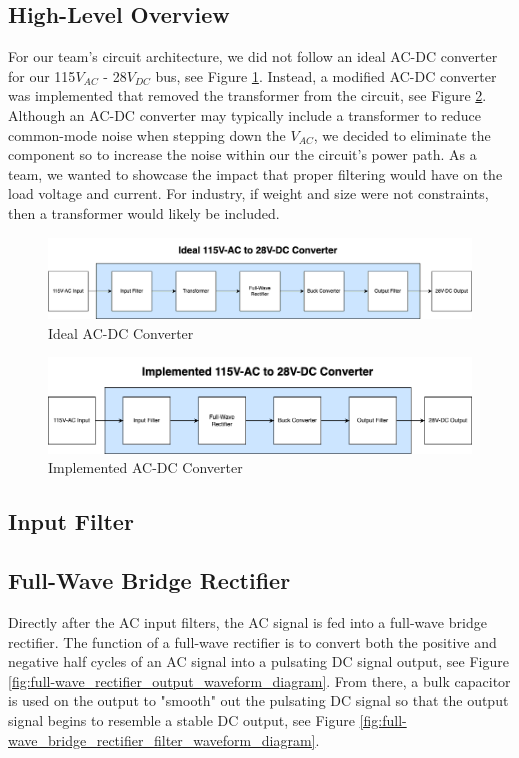 \documentclass[conference]{IEEEtran}
\begin{document}
\subsection{High-Level Overview}

For our team's circuit architecture, we did not follow an ideal AC-DC converter for our 115$V_{AC}$ - 28$V_{DC}$ bus, see Figure \ref{fig:ac_dc_converter_ideal_diagram}. Instead, a modified AC-DC converter was implemented that removed the transformer from the circuit, see Figure \ref{fig:ac_dc_converter_implemented_diagram}. Although an AC-DC converter may typically include a transformer to reduce common-mode noise when stepping down the $V_{AC}$, we decided to eliminate the component so to increase the noise within our the circuit's power path. As a team, we wanted to showcase the impact that proper filtering would have on the load voltage and current. For industry, if weight and size were not constraints, then a transformer would likely be included.

\begin{figure}[htbp]
    \centering
    \includegraphics[width=1.0\linewidth]{ac_dc_converter_ideal.png}
    \caption{Ideal AC-DC Converter}
    \label{fig:ac_dc_converter_ideal_diagram}
\end{figure}

\begin{figure}[h]
    \centering
    \includegraphics[width=1.0\linewidth]{ac_dc_converter_implemented.png}
    \caption{Implemented AC-DC Converter}
    \label{fig:ac_dc_converter_implemented_diagram}
\end{figure}

\subsection{Input Filter}

\subsection{Full-Wave Bridge Rectifier}
Directly after the AC input filters, the AC signal is fed into a full-wave bridge rectifier. The function of a full-wave rectifier is to convert both the positive and negative half cycles of an AC signal into a pulsating DC signal output, see Figure \ref{fig:full-wave_rectifier_output_waveform_diagram}. From there, a bulk capacitor is used on the output to "smooth" out the pulsating DC signal so that the output signal begins to resemble a stable DC output, see Figure \ref{fig:full-wave_bridge_rectifier_filter_waveform_diagram}. 
\end{document}
